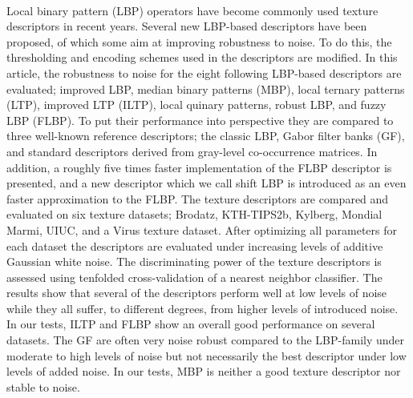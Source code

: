 {{\begin{enumerate}
\\ \aabstract
Local binary pattern (LBP) operators have become commonly used texture descriptors in recent years. Several new LBP-based descriptors have been proposed, of which some aim at improving robustness to noise. To do this, the thresholding and encoding schemes used in the descriptors are modified. In this article, the robustness to noise for the eight following LBP-based descriptors are evaluated; improved LBP, median binary patterns (MBP), local ternary patterns (LTP), improved LTP (ILTP), local quinary patterns, robust LBP, and fuzzy LBP (FLBP). To put their performance into perspective they are compared to three well-known reference descriptors; the classic LBP, Gabor filter banks (GF), and standard descriptors derived from gray-level co-occurrence matrices. In addition, a roughly five times faster implementation of the FLBP descriptor is presented, and a new descriptor which we call shift LBP is introduced as an even faster approximation to the FLBP. The texture descriptors are compared and evaluated on six texture datasets; Brodatz, KTH-TIPS2b, Kylberg, Mondial Marmi, UIUC, and a Virus texture dataset. After optimizing all parameters for each dataset the descriptors are evaluated under increasing levels of additive Gaussian white noise. The discriminating power of the texture descriptors is assessed using tenfolded cross-validation of a nearest neighbor classifier. The results show that several of the descriptors perform well at low levels of noise while they all suffer, to different degrees, from higher levels of introduced noise. In our tests, ILTP and FLBP show an overall good performance on several datasets. The GF are often very noise robust compared to the LBP-family under moderate to high levels of noise but not necessarily the best descriptor under low levels of added noise. In our tests, MBP is neither a good texture descriptor nor stable to noise.


\end{enumerate}}}
